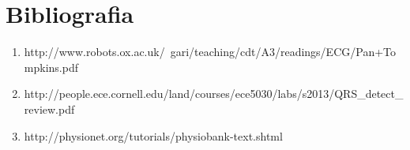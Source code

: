\chapter{Bibliografia}

\vspace*{1cm}

\begin{enumerate}[\lbrack 1\rbrack]
	\item http://www.robots.ox.ac.uk/~gari/teaching/cdt/A3/readings/ECG/Pan+Tompkins.pdf \label{bib:algorithm}
	\item http://people.ece.cornell.edu/land/courses/ece5030/labs/s2013/QRS\_detect\_review.pdf \label{bib:method}
	\item http://physionet.org/tutorials/physiobank-text.shtml \label{bib:physio}
\end{enumerate}

